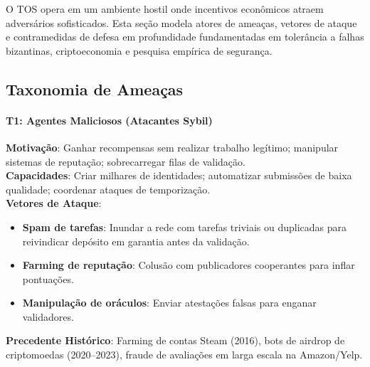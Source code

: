 \documentclass[11pt]{article}
\begin{document}
\begin{itemize}[noitemsep]
\begin{itemize}[noitemsep]
\begin{itemize}[noitemsep]
O TOS opera em um ambiente hostil onde incentivos econômicos atraem adversários sofisticados. Esta seção modela atores de ameaças, vetores de ataque e contramedidas de defesa em profundidade fundamentadas em tolerância a falhas bizantinas, criptoeconomia e pesquisa empírica de segurança.

\subsection{Taxonomia de Ameaças}

\paragraph{T1: Agentes Maliciosos (Atacantes Sybil)}
\textbf{Motivação}: Ganhar recompensas sem realizar trabalho legítimo; manipular sistemas de reputação; sobrecarregar filas de validação.\\
\textbf{Capacidades}: Criar milhares de identidades; automatizar submissões de baixa qualidade; coordenar ataques de temporização.\\
\textbf{Vetores de Ataque}:
\begin{itemize}[noitemsep]
  \item \textbf{Spam de tarefas}: Inundar a rede com tarefas triviais ou duplicadas para reivindicar depósito em garantia antes da validação.
  \item \textbf{Farming de reputação}: Colusão com publicadores cooperantes para inflar pontuações.
  \item \textbf{Manipulação de oráculos}: Enviar atestações falsas para enganar validadores.
\end{itemize}
\textbf{Precedente Histórico}: Farming de contas Steam (2016), bots de airdrop de criptomoedas (2020--2023), fraude de avaliações em larga escala na Amazon/Yelp.


\end{itemize}
\end{itemize}
\end{itemize}
\end{document}
